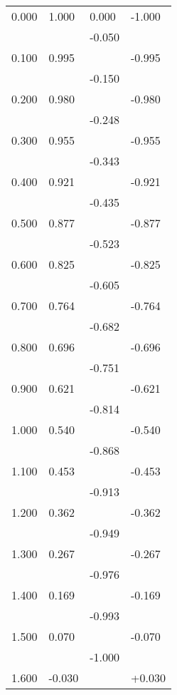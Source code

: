 \documentclass[12pt,oneside]{book}
\begin{document}
{\begin{longtable}{@{}llll@{}}
0.000 & 1.000  & 0.000  & -1.000 \\
      &        & -0.050 &        \\
0.100 & 0.995  &        & -0.995 \\
      &        & -0.150 &        \\
0.200 & 0.980  &        & -0.980 \\
      &        & -0.248 &        \\
0.300 & 0.955  &        & -0.955 \\
      &        & -0.343 &        \\
0.400 & 0.921  &        & -0.921 \\
      &        & -0.435 &        \\
0.500 & 0.877  &        & -0.877 \\
      &        & -0.523 &        \\
0.600 & 0.825  &        & -0.825 \\
      &        & -0.605 &        \\
0.700 & 0.764  &        & -0.764 \\
      &        & -0.682 &        \\
0.800 & 0.696  &        & -0.696 \\
      &        & -0.751 &        \\
0.900 & 0.621  &        & -0.621 \\
      &        & -0.814 &        \\
1.000 & 0.540  &        & -0.540 \\
      &        & -0.868 &        \\
1.100 & 0.453  &        & -0.453 \\
      &        & -0.913 &        \\
1.200 & 0.362  &        & -0.362 \\
      &        & -0.949 &        \\
1.300 & 0.267  &        & -0.267 \\
      &        & -0.976 &        \\
1.400 & 0.169  &        & -0.169 \\
      &        & -0.993 &        \\
1.500 & 0.070  &        & -0.070 \\
      &        & -1.000 &        \\
1.600 & -0.030 &        & +0.030  \\ \bottomrule
\end{longtable}
}
\end{document}
